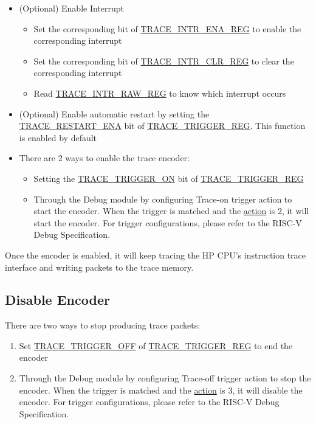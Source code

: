 \documentclass[main\_\_EN.tex]{subfiles}
\begin{document}
\begin{itemize}
    \item (Optional) Enable Interrupt
        \begin{itemize}
            \item Set the corresponding bit of \hyperref[regdesc:TRACEINTRENAREG]{TRACE\_INTR\_ENA\_REG} to enable the corresponding interrupt
            \item Set the corresponding bit of \hyperref[regdesc:TRACEINTRCLRREG]{TRACE\_INTR\_CLR\_REG} to clear the corresponding interrupt
            \item Read \hyperref[regdesc:TRACEINTRRAWREG]{TRACE\_INTR\_RAW\_REG} to know which interrupt occurs
        \end{itemize}
    \item (Optional) Enable automatic restart by setting the \hyperref[fielddesc:TRACERESTARTENA]{TRACE\_RESTART\_ENA} bit of \hyperref[regdesc:TRACETRIGGERREG]{TRACE\_TRIGGER\_REG}. This function is enabled by default



    \item There are 2 ways to enable the trace encoder:
        \begin{itemize}
            \item Setting the \hyperref[fielddesc:TRACETRIGGERON]{TRACE\_TRIGGER\_ON} bit of \hyperref[regdesc:TRACETRIGGERREG]{TRACE\_TRIGGER\_REG}
            \item Through the Debug module by configuring Trace-on trigger action to start the encoder. When the trigger is matched and the \hyperref[fielddesc:MCONTROLACTION]{action} is 2, it will start the encoder. For trigger configurations, please refer to the RISC-V Debug Specification.
        \end{itemize}

\end{itemize}

Once the encoder is enabled, it will keep tracing the HP CPU's instruction trace interface and writing packets to the trace memory.


\subsection{Disable Encoder}

There are two ways to stop producing trace packets:
\begin{enumerate}
    \item Set \hyperref[fielddesc:TRACETRIGGEROFF]{TRACE\_TRIGGER\_OFF} of \hyperref[regdesc:TRACETRIGGERREG]{TRACE\_TRIGGER\_REG} to end the encoder
    \item Through the Debug module by configuring Trace-off trigger action to stop the encoder. When the trigger is matched and the \hyperref[fielddesc:MCONTROLACTION]{action} is 3, it will disable the encoder. For trigger configurations, please refer to the RISC-V Debug Specification.
\end{enumerate}
\end{document}
